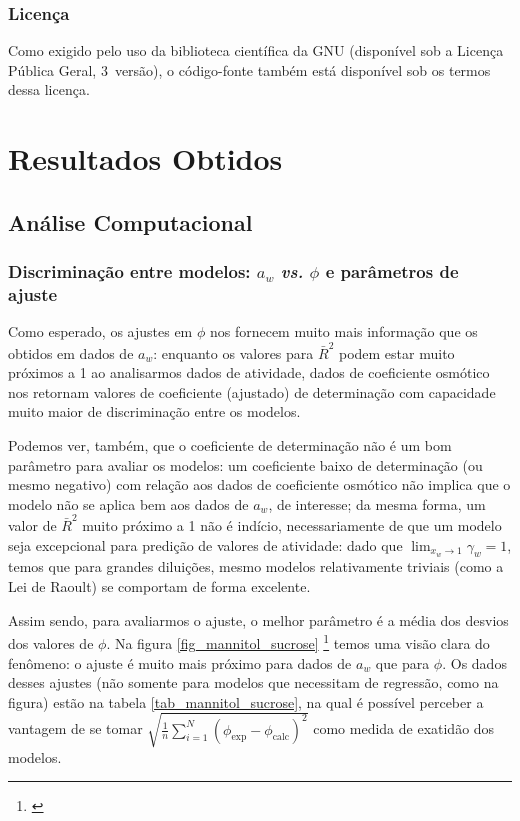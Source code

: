 \documentclass[
	12pt,				%
	openright,
	twoside,
	a4paper,			%
	english,			%
	french,				%
	brazil				%
	]{abntex2}
\begin{document}
\section{Licença}

Como exigido pelo uso da biblioteca científica da GNU (disponível sob a Licença
Pública Geral, 3\textordfeminine\ versão), o código-fonte também está disponível
sob os termos dessa licença.

\part{Resultados Obtidos}

\chapter{Análise Computacional}

\section{Discriminação entre modelos: $a_w$ \textit{vs.} $\phi$ e %
parâmetros de ajuste}

Como esperado, os ajustes em $\phi$ nos fornecem muito mais informação que os
obtidos em dados de $a_w$: enquanto os valores para $\bar{R}^2$ podem estar
muito próximos a 1 ao analisarmos dados de atividade, dados de coeficiente
osmótico nos retornam valores de coeficiente (ajustado) de determinação com
capacidade muito maior de discriminação entre os modelos.

Podemos ver, também, que o coeficiente de determinação não é um bom parâmetro para
avaliar os modelos: um coeficiente baixo de determinação (ou mesmo negativo) com
relação aos dados de coeficiente osmótico não implica que o modelo não se aplica
bem aos dados de $a_w$, de interesse; da mesma forma, um valor de $\bar{R}^2$ muito
próximo a 1 não é indício, necessariamente de que um modelo seja excepcional para
predição de valores de atividade: dado que $\lim_{x_w \to 1}\gamma_w = 1$, temos
que para grandes diluições, mesmo modelos relativamente triviais (como a Lei de
Raoult) se comportam de forma excelente.

Assim sendo, para avaliarmos o ajuste, o melhor parâmetro é a média dos desvios
dos valores de $\phi$. Na figura \ref{fig_mannitol_sucrose}
\footnote{\cite{stokes1961}} temos uma visão clara do fenômeno: o ajuste é muito
mais próximo para dados de $a_w$ que para $\phi$. Os dados desses ajustes (não
somente para modelos que necessitam de regressão, como na figura) estão na tabela
\ref{tab_mannitol_sucrose}, na qual é possível perceber a vantagem de se tomar
$\sqrt{\frac{1}{n}\sum_{i=1}^N(\phi_{\text{exp}}-\phi_{\text{calc}})^2}$
como medida de exatidão dos modelos.
\end{document}

